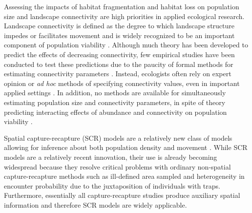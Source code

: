 \documentclass[12pt]{article}
\begin{document}
\begin{spacing}{1.8}
Assessing the impacts of habitat fragmentation and habitat loss on
population size and landscape connectivity
are high priorities in applied ecological research.
Landscape connectivity is defined as the
degree to which landscape structure impedes or facilitates movement
\citep{tischendorf_fahrig:2000} and is widely recognized to be an
important component of population viability
\citep{with_crist:1995}. Although much theory has
been developed to predict the effects of decreasing
connectivity, few empirical studies have been conducted to test these
predictions due to the paucity of formal methods for estimating connectivity
parameters \citep{cushman_etal:2010}. Instead, ecologists often rely on expert opinion or
\textit{ad hoc} methods of specifying connectivity values, even in
important applied settings
\citep{adriaensen_etal:2003,beier_etal:2008,zeller_etal:2012}. In addition, no
methods are available for simultaneously estimating population size and
connectivity parameters, in spite of theory
predicting interacting effects of abundance and connectivity on
population viability \citep{tischendorf_etal:2005,cushman_etal:2010}.

Spatial capture-recapture (SCR) models are a relatively new class of
models allowing for inference about both population density and
movement %
\citep{efford:2004,borchers_efford:2008, royle_young:2008, efford_etal:2009ecol,
  royle_etal:2009ecol}. While SCR models are a relatively recent innovation,
their use is already becoming widespread \citep{efford_etal:2009ecol,
  gardner_etal:2010jwm, gardner_etal:2010ecol,kery_etal:2010,
  gopalaswamy_etal:2012, foster_harmsen:2012} because they resolve
critical problems with ordinary non-spatial capture-recapture
methods such as ill-defined area sampled and heterogeneity in
encounter probability due to the juxtaposition of individuals with
traps. Furthermore,
essentially all capture-recapture studies produce auxiliary spatial
information and therefore SCR models are widely applicable.



\end{spacing}
\end{document}

